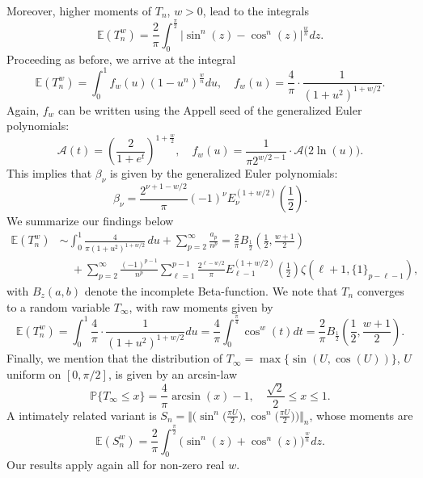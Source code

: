 \documentclass[10pt,reqno,a4paper]{amsart}%
\theoremstyle{definition}
\newcommand{\E}{\ensuremath{\mathbb{E}}} %
\newcommand{\ap}{\ensuremath{\mathcal{A}}}%
\begin{document}
Moreover, higher moments of $T_n$, $w>0$, lead to the integrals
\[
\E(T_n^w)=\frac{2}{\pi}\int_0^{\frac{\pi}2}|\sin^n(z)-\cos^n(z)|^{\frac{w}n}dz.
\]
Proceeding as before, we arrive at the integral
\[
\E(T_n^w)=\int_0^1 f_w(u)(1-u^n)^{\frac{w}{n}}du, \quad f_w(u)=\frac{4}{\pi}\cdot\frac{1}{(1+u^2)^{1+w/2}}.
\]
Again, $f_w$ can be written using the Appell seed of the generalized Euler
polynomials:
\[
\ap(t)=\left(  \frac{2}{1+e^{t}}\right)^{1+\frac{w}{2}},\quad
f_w(u)%
=\frac{1}{\pi 2^{w/2-1}}\cdot\ap%
\big(2\ln(u)\big).
\]
This implies that $\beta_{\nu}$ is given by the generalized Euler
polynomials:
\[
\beta_{\nu}=\frac{2^{\nu+1-w/2}}{\pi}(-1)^{\nu}E_{\nu}^{(1+w/2)}(\frac{1}{2}).
\]
We summarize our findings below
\[%
\begin{split}
\E(T_n^w) &  \sim\int_{0}^{1}\frac{4}{\pi(1+u^{2})^{1+w/2}}\,du+\sum_{p=2}^{\infty
}\frac{a_{p}}{n^{p}}  =\frac2{\pi}B_{\frac12}(\frac12,\frac{w+1}2)\\
&\quad+\sum_{p=2}^{\infty}\frac{(-1)^{p-1}}{n^{p}}\sum_{\ell=1}^{p-1}%
\frac{2^{\ell-w/2}}{\pi}E_{\ell-1}^{(1+w/2)}(\frac{1}%
{2})\zeta(\ell+1,\{1\}_{p-\ell-1}),
\end{split}
\]
with $B_z(a,b)$ denote the incomplete Beta-function. We note that $T_n$ converges to a random variable $T_\infty$, with raw moments given by
\[
\E(T_n^w) = \int_0^{1}\frac{4}{\pi}\cdot\frac{1}{(1+u^2)^{1+w/2}}du =\frac{4}{\pi}\int_0^{\frac{\pi}4}\cos^w(t)dt
=\frac2{\pi}B_{\frac12}(\frac12,\frac{w+1}2).
\]
Finally, we mention that the distribution of $T_\infty=\max\{\sin(U,\cos(U))\}$, $U$ uniform on $[0,\pi/2]$, is given by an arcsin-law
\[
\mathbb{P}\{T_\infty \le x \}=\frac{4}\pi \arcsin(x)-1,\quad \frac{\sqrt{2}}2\le x\le 1.
\]
A intimately related variant is $S_{n}=\Vert\Big(\sin^n\big(\frac{\pi U}2  \big),\cos^n\big(\frac{\pi U}2 \big)\Big)\Vert_{n}$,
whose moments are 
\[
\E(S_n^w)=\frac{2}{\pi}\int_0^{\frac{\pi}2}\big(\sin^n(z)+\cos^n(z)\big)^{\frac{w}n}dz.
\]
Our results apply again all for non-zero real $w$.
\end{document}
